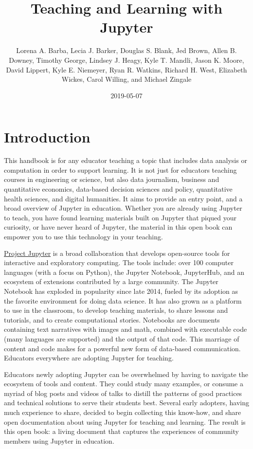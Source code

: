 \documentclass[]{book}
\title{Teaching and Learning with Jupyter}
\author{Lorena A. Barba, Lecia J. Barker, Douglas S. Blank, Jed Brown, Allen B. Downey, Timothy George, Lindsey J. Heagy, Kyle T. Mandli, Jason K. Moore, David Lippert, Kyle E. Niemeyer, Ryan R. Watkins, Richard H. West, Elizabeth Wickes, Carol Willing, and Michael Zingale}
\date{2019-05-07}
\begin{document}
\maketitle

{
\setcounter{tocdepth}{1}
\tableofcontents
}
\hypertarget{intro}{%
\chapter{Introduction}\label{intro}}

This handbook is for any educator teaching a topic that includes data analysis
or computation in order to support learning. It is not just for educators teaching courses in engineering or
science, but also data journalism, business and quantitative economics,
data-based decision sciences and policy, quantitative health sciences, and
digital humanities. It aims to provide an entry point, and a broad overview of
Jupyter in education. Whether you are already using Jupyter to teach, you have
found learning materials built on Jupyter that piqued your curiosity, or have
never heard of Jupyter, the material in this open book can empower you to
use this technology in your teaching.

\href{http://jupyter.org/}{Project Jupyter} is a broad collaboration that develops
open-source tools for interactive and exploratory computing. The tools include:
over 100 computer languages (with a focus on Python), the Jupyter Notebook, JupyterHub,
and an ecosystem of extensions
contributed by a large community. The Jupyter Notebook has exploded in popularity since
late 2014, fueled by its adoption as the favorite environment for doing data
science. It has also grown as a platform to use in the classroom, to develop
teaching materials, to share lessons and tutorials, and to create
computational stories. Notebooks are documents containing text narratives with images and math,
combined with executable code (many languages are supported) and the output of
that code. This marriage of content and code makes for a powerful new form of
data-based communication. Educators everywhere are adopting Jupyter for
teaching.

Educators newly adopting Jupyter can be overwhelmed by having to navigate the
ecosystem of tools and content. They could study many examples, or consume a
myriad of blog posts and videos of talks to distill the patterns of good practices
and technical solutions to serve their students best. Several early adopters,
having much experience to share, decided to begin collecting this know-how, and
share open documentation about using Jupyter for teaching and learning. The
result is this open book: a living document that captures the experiences of
community members using Jupyter in education.
\end{document}
